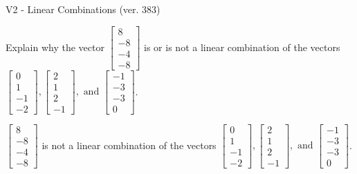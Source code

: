 \begin{exercise}
  \begin{exerciseTitle}V2 - Linear Combinations (ver. 383)\end{exerciseTitle}
  \begin{exerciseStatement}
    Explain why the vector \(\left[\begin{array}{c}
8 \\
-8 \\
-4 \\
-8
\end{array}\right]\)  is or is not a linear 
	combination of the vectors \(\left[\begin{array}{c}
0 \\
1 \\
-1 \\
-2
\end{array}\right] , \left[\begin{array}{c}
2 \\
1 \\
2 \\
-1
\end{array}\right] , \text{ and } \left[\begin{array}{c}
-1 \\
-3 \\
-3 \\
0
\end{array}\right]\).
	


  \end{exerciseStatement}
  \begin{exerciseAnswer}
   \(\left[\begin{array}{c}
8 \\
-8 \\
-4 \\
-8
\end{array}\right]\) 
  	 is not  
	a linear combination of the vectors \(\left[\begin{array}{c}
0 \\
1 \\
-1 \\
-2
\end{array}\right] , \left[\begin{array}{c}
2 \\
1 \\
2 \\
-1
\end{array}\right] , \text{ and } \left[\begin{array}{c}
-1 \\
-3 \\
-3 \\
0
\end{array}\right]\).

	
  


  \end{exerciseAnswer}
\end{exercise}